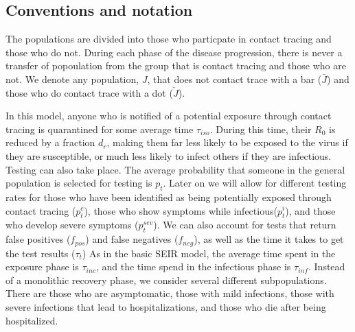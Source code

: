 \documentclass[notitlepage, superscriptaddress]{revtex4-2}
\begin{document}
\subsection{Conventions and notation}
The populations are divided into those who particpate in contact tracing and those who do not. During each phase of the disease progression, there is never a transfer of popoulation from the group that is contact tracing and those who are not. We denote any population, $J$, that does not contact trace with a bar ($\bar{J}$) and those who do contact trace with a dot ($\check{J}$). 

In this model, anyone who is notified of a potential exposure through contact tracing is quarantined for some average time $\tau_{iso}$. During this time, their $R_{0}$ is reduced by a fraction $d_{r}$, making them far less likely to be exposed to the virus if they are susceptible, or much less likely to infect others if they are infectious. Testing can also take place. The average probability that someone in the general population is selected for testing is $p_{t}$. Later on we will allow for different testing rates for those who have been identified as being potentially exposed through contact tracing ($p^{c}_{t}$), those who show symptoms while infectious($p^{i}_{t}$), and those who develop severe symptoms ($p^{sev}_{t}$). We can also account for tests that return false positives ($f_{pos}$) and false negatives ($f_{neg}$), as well as the time it takes to get the test results ($\tau_{t}$) As in the basic SEIR model, the average time spent in the exposure phase is $\tau_{inc}$, and the time spend in the infectious phase is $\tau_{inf}$. Instead of a monolithic recovery phase, we consider several different subpopulations. There are those who are asymptomatic, those with mild infections, those with severe infections that lead to hospitalizations, and those who die after being hospitalized.

\end{document}
